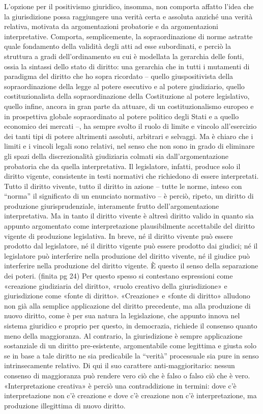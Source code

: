 L’opzione per il positivismo giuridico, insomma, non comporta affatto l’idea che la giurisdizione possa raggiungere una verità certa e assoluta anziché una verità relativa, motivata da argomentazioni probatorie e da argomentazioni interpretative. Comporta, semplicemente, la sopraordinazione di norme astratte quale fondamento della validità degli atti ad esse subordinati, e perciò la struttura a gradi dell’ordinamento su cui è modellata la gerarchia delle fonti, ossia la sintassi dello stato di diritto: una gerarchia che in tutti i mutamenti di paradigma del diritto che ho sopra ricordato – quello giuspositivista della sopraordinazione della legge al potere esecutivo e al potere giudiziario, quello costituzionalista della sopraordinazione della Costituzione al potere legislativo, quello infine, ancora in gran parte da attuare, di un costituzionalismo europeo e in prospettiva globale sopraordinato al potere politico degli Stati e a quello economico dei mercati –, ha sempre svolto il ruolo di limite e vincolo all’esercizio dei tanti tipi di potere altrimenti assoluti, arbitrari e selvaggi. Ma è chiaro che i limiti e i vincoli legali sono relativi, nel senso che non sono in grado di eliminare gli spazi della discrezionalità giudiziaria colmati sia dall’argomentazione probatoria che da quella interpretativa. Il legislatore, infatti, produce solo il diritto vigente, consistente in testi normativi che richiedono di essere interpretati. Tutto il diritto vivente, tutto il diritto in azione – tutte le norme, inteso con “norma” il significato di un enunciato normativo – è perciò, ripeto, un diritto di produzione giurisprudenziale, interamente frutto dell’argomentazione interpretativa. Ma in tanto il diritto vivente è altresì diritto valido in quanto sia appunto argomentato come interpretazione plausibilmente accettabile del diritto vigente di produzione legislativa. In breve, né il diritto vivente può essere prodotto dal legislatore, né il diritto vigente può essere prodotto dai giudici; né il legislatore può interferire nella produzione del diritto vivente, né il giudice può interferire nella produzione del diritto vigente. È questo il senso della separazione dei poteri. (finita pg 24)
Per questo spesso si contestano espressioni come «creazione giudiziaria del diritto», «ruolo creativo della giurisdizione» e giurisdizione come «fonte di diritto». «Creazione» e «fonte di diritto» alludono non già alla semplice applicazione del diritto precedente, ma alla produzione di nuovo diritto, come è per sua natura la legislazione, che appunto innova nel sistema giuridico e proprio per questo, in democrazia, richiede il consenso quanto meno della maggioranza. Al contrario, la giurisdizione è sempre applicazione sostanziale di un diritto pre-esistente, argomentabile come legittima e giusta solo se in base a tale diritto ne sia predicabile la “verità” processuale sia pure in senso intrinsecamente relativo. Di qui il suo carattere anti-maggioritario: nessun consenso di maggioranza può rendere vero ciò che è falso o falso ciò che è vero. «Interpretazione creativa» è perciò una contraddizione in termini: dove c’è interpretazione non c’è creazione e dove c’è creazione non c’è interpretazione, ma produzione illegittima di nuovo diritto. 
